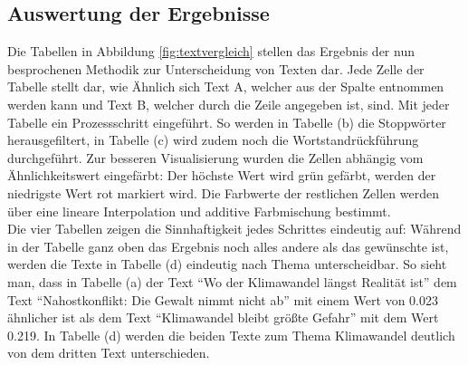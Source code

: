 \subsection{Auswertung der Ergebnisse}
Die Tabellen in Abbildung \ref{fig:textvergleich} stellen das Ergebnis der nun besprochenen Methodik zur Unterscheidung von Texten dar. Jede Zelle der Tabelle stellt dar, wie Ähnlich sich Text A, welcher aus der Spalte entnommen werden kann und Text B, welcher durch die Zeile angegeben ist, sind. Mit jeder Tabelle ein Prozessschritt eingeführt. So werden in Tabelle (b) die Stoppwörter herausgefiltert, in Tabelle (c) wird zudem noch die Wortstandrückführung durchgeführt. Zur besseren Visualisierung wurden die Zellen abhängig vom Ähnlichkeitswert eingefärbt: Der höchste Wert wird grün gefärbt, werden der niedrigste Wert rot markiert wird. Die Farbwerte der restlichen Zellen werden über eine lineare Interpolation und additive Farbmischung bestimmt.\\ \newline
Die vier Tabellen zeigen die Sinnhaftigkeit jedes Schrittes eindeutig auf: Während in der Tabelle ganz oben das Ergebnis noch alles andere als das gewünschte ist, werden die Texte in Tabelle (d) eindeutig nach Thema unterscheidbar. So sieht man, dass  in Tabelle (a)  der Text "`Wo der Klimawandel längst Realität ist"' dem Text "`Nahostkonflikt: Die Gewalt nimmt nicht ab"' mit einem Wert von 0.023 ähnlicher ist als dem Text "`Klimawandel bleibt größte Gefahr"' mit dem Wert 0.219. In Tabelle (d) werden die beiden Texte zum Thema Klimawandel deutlich von dem dritten Text unterschieden. 
